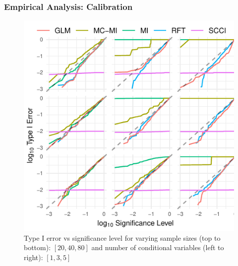 \documentclass{beamer}
\begin{document}
\begin{frame}
	\frametitle{Empirical Analysis: Calibration}
	\begin{figure}
		\centering
		\includegraphics[scale=0.8]{imgs/calibration_add_vars.pdf}
		\caption*{Type I error vs significance level for varying sample sizes (top to
		bottom): $ [20, 40, 80] $ and number of conditional variables (left to
		right): $ [1, 3, 5] $}
	\end{figure}
\end{frame}
\end{document}
